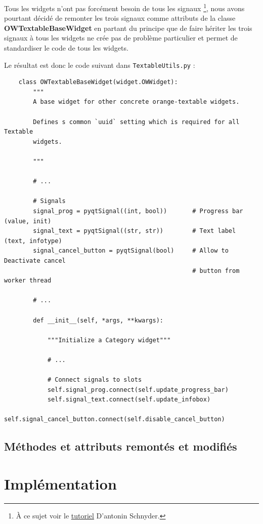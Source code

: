 \documentclass{article}
\begin{document}
Tous les widgets n'ont pas forcément besoin de tous les signaux \footnote{À ce sujet voir le \href{https://docs.google.com/document/d/1QtXm2aYMZXAyM7mfBTqxt_XrTNFqC7e3aqy7OC1A_18/edit}{tutoriel} D'antonin Schnyder.}, nous avons pourtant décidé de remonter les trois signaux comme attributs de la classe \textbf{OWTextableBaseWidget} en partant du principe que de faire hériter les trois signaux à tous les widgets ne crée pas de problème particulier et permet de standardiser le code de tous les widgets. 

Le résultat est donc le code suivant dans \texttt{TextableUtils.py} : 

\begin{verbatim}
    class OWTextableBaseWidget(widget.OWWidget):
        """
        A base widget for other concrete orange-textable widgets.
    
        Defines s common `uuid` setting which is required for all Textable
        widgets.
    
        """

        # ...

        # Signals
        signal_prog = pyqtSignal((int, bool))       # Progress bar (value, init)
        signal_text = pyqtSignal((str, str))        # Text label (text, infotype)
        signal_cancel_button = pyqtSignal(bool)     # Allow to Deactivate cancel
                                                    # button from worker thread

        # ...
        
        def __init__(self, *args, **kwargs):

            """Initialize a Category widget"""

            # ...

            # Connect signals to slots
            self.signal_prog.connect(self.update_progress_bar) 
            self.signal_text.connect(self.update_infobox)
            self.signal_cancel_button.connect(self.disable_cancel_button)
\end{verbatim}



\subsection{Méthodes et attributs remontés et modifiés}

\section{Implémentation}
\end{document}
